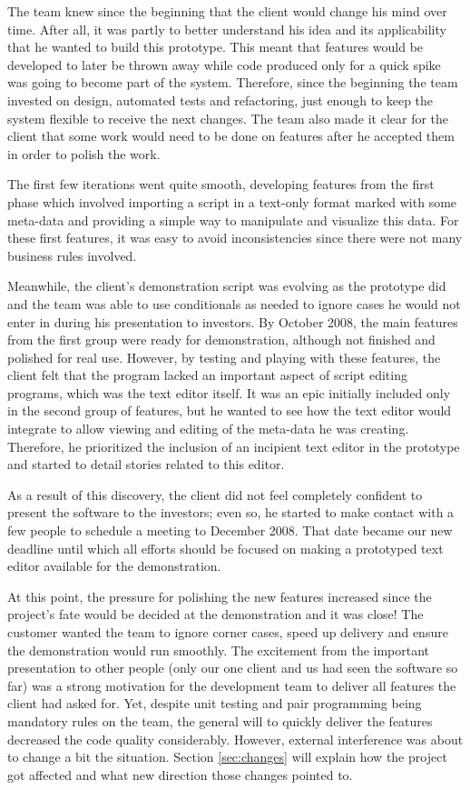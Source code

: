 \documentclass[lnbip]{svmultln}
\begin{document}
The team knew since the beginning that the client would change his
mind over time. After all, it was partly to better understand his idea
and its applicability that he wanted to build this prototype. This
meant that features would be developed to later be thrown away while
code produced only for a quick spike was going to become part of the
system. Therefore, since the beginning the team invested on design,
automated tests and refactoring, just enough to keep the system
flexible to receive the next changes. The team also made it clear for
the client that some work would need to be done on features after he
accepted them in order to polish the work.

The first few iterations went quite smooth, developing features from
the first phase which involved importing a script in a text-only
format marked with some meta-data and providing a simple way
to manipulate and visualize this data. For these first features, it
was easy to avoid inconsistencies since there were not many business
rules involved.

Meanwhile, the client's demonstration script was evolving as the
prototype did and the team was able to use conditionals as needed to
ignore cases he would not enter in during his presentation to
investors. By October 2008, the main features from the first group
were ready for demonstration, although not finished and polished for
real use. However, by testing and playing with these features, the
client felt that the program lacked an important aspect of script
editing programs, which was the text editor itself. It was an epic
initially included only in the second group of features, but he wanted
to see how the text editor would integrate to allow viewing and
editing of the meta-data he was creating. Therefore, he prioritized
the inclusion of an incipient text editor in the prototype and started
to detail stories related to this editor.

As a result of this discovery, the client did not feel completely confident to
present the software to the investors; even so, he started to make contact with
a few people to schedule a meeting to December 2008. That date became our new
deadline until which all efforts should be focused on making a prototyped text
editor available for the demonstration.

At this point, the pressure for polishing the new features increased
since the project's fate would be decided at the demonstration and it
was close! The customer wanted the team to ignore corner cases, speed
up delivery and ensure the demonstration would run smoothly. The
excitement from the important presentation to other people (only our
one client and us had seen the software so far) was a strong
motivation for the development team to deliver all features the client
had asked for. Yet, despite unit testing and pair programming being
mandatory rules on the team, the general will to quickly deliver the
features decreased the code quality considerably. However, external interference
was about to change a bit the situation. Section \ref{sec:changes} will explain
how the project got affected and what new direction those changes pointed to.
\end{document}
